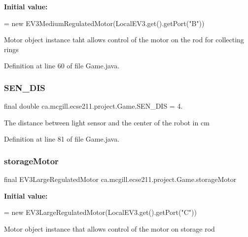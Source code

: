 {\bfseries Initial value\+:}
\begin{DoxyCode}
=
      \textcolor{keyword}{new} EV3MediumRegulatedMotor(LocalEV3.get().getPort(\textcolor{stringliteral}{"B"}))
\end{DoxyCode}
Motor object instance taht allows control of the motor on the rod for collecting rings 

Definition at line 60 of file Game.\+java.

\mbox{\label{classca_1_1mcgill_1_1ecse211_1_1project_1_1_game_a7eb34dc64ead0f2c0db2367f773ae94c}} 
\subsubsection{\texorpdfstring{S\+E\+N\+\_\+\+D\+IS}{SEN\_DIS}}
{\footnotesize\ttfamily final double ca.\+mcgill.\+ecse211.\+project.\+Game.\+S\+E\+N\+\_\+\+D\+IS = 4.\hspace{0.3cm}{\ttfamily [static]}}

The distance between light sensor and the center of the robot in cm 

Definition at line 81 of file Game.\+java.

\mbox{\label{classca_1_1mcgill_1_1ecse211_1_1project_1_1_game_a37d42c1d3b40b8eaa429866e37cd86c7}} 
\subsubsection{\texorpdfstring{storage\+Motor}{storageMotor}}
{\footnotesize\ttfamily final E\+V3\+Large\+Regulated\+Motor ca.\+mcgill.\+ecse211.\+project.\+Game.\+storage\+Motor\hspace{0.3cm}{\ttfamily [static]}}

{\bfseries Initial value\+:}
\begin{DoxyCode}
=
      \textcolor{keyword}{new} EV3LargeRegulatedMotor(LocalEV3.get().getPort(\textcolor{stringliteral}{"C"}))
\end{DoxyCode}
Motor object instance that allows control of the motor on storage rod 

